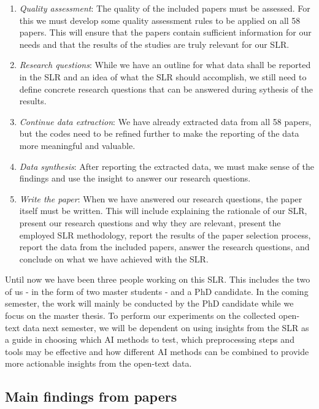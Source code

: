 \begin{enumerate}
    \item \textit{Quality assessment}: The quality of the included papers must be assessed. For this we must develop some quality assessment rules to be applied on all 58 papers. This will ensure that the papers contain sufficient information for our needs and that the results of the studies are truly relevant for our SLR.
    \item \textit{Research questions}: While we have an outline for what data shall be reported in the SLR and an idea of what the SLR should accomplish, we still need to define concrete research questions that can be answered during sythesis of the results.
    \item \textit{Continue data extraction}: We have already extracted data from all 58 papers, but the codes need to be refined further to make the reporting of the data more meaningful and valuable.
    \item \textit{Data synthesis}: After reporting the extracted data, we must make sense of the findings and use the insight to answer our research questions.
    \item \textit{Write the paper}: When we have answered our research questions, the paper itself must be written. This will include explaining the rationale of our SLR, present our research questions and why they are relevant, present the employed SLR methodology, report the results of the paper selection process, report the data from the included papers, answer the research questions, and conclude on what we have achieved with the SLR.
\end{enumerate}

Until now we have been three people working on this SLR. This includes the two of us - in the form of two master students - and a PhD candidate. In the coming semester, the work will mainly be conducted by the PhD candidate while we focus on the master thesis. To perform our experiments on the collected open-text data next semester, we will be dependent on using insights from the SLR as a guide in choosing which AI methods to test, which preprocessing steps and tools may be effective and how different AI methods can be combined to provide more actionable insights from the open-text data.

\subsection{Main findings from papers}

